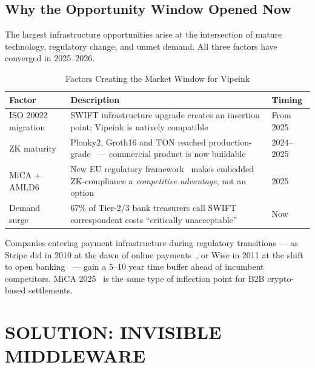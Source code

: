 \documentclass[11pt,a4paper]{article}
\begin{document}
\subsection*{Why the Opportunity Window Opened Now}

The largest infrastructure opportunities arise at the intersection of mature technology, regulatory change, and unmet demand. All three factors have converged in 2025--2026.

\begin{table}[htbp]
\centering
\caption{Factors Creating the Market Window for Vipeink}
\begin{tabularx}{\linewidth}{@{}lXl@{}}
\toprule
\textbf{Factor} & \textbf{Description} & \textbf{Timing} \\
\midrule
ISO 20022 migration   & SWIFT infrastructure upgrade creates an insertion point; Vipeink is natively compatible~\cite{swift_iso20022}              & From 2025 \\
ZK maturity           & Plonky2, Groth16 and TON reached production-grade~\cite{plonky2,groth16,ton_wp} --- commercial product is now buildable            & 2024--2025 \\
MiCA + AMLD6           & New EU regulatory framework~\cite{mica_reg,amld6} makes embedded ZK-compliance a \textit{competitive advantage}, not an option & 2025 \\
Demand surge          & 67\% of Tier-2/3 bank treasurers call SWIFT correspondent costs ``critically unacceptable''~\cite{mckinsey_2024}           & Now \\
\bottomrule
\end{tabularx}
\end{table}

\begin{tcolorbox}[insightbox, title={Investor Insight}]
Companies entering payment infrastructure during regulatory transitions --- as Stripe did in 2010 at the dawn of online payments~\cite{stripe_s1}, or Wise in 2011 at the shift to open banking~\cite{wise_ar} --- gain a 5--10 year time buffer ahead of incumbent competitors. MiCA 2025~\cite{mica_reg} is the same type of inflection point for B2B crypto-based settlements.
\end{tcolorbox}


\FloatBarrier
\section{SOLUTION: INVISIBLE MIDDLEWARE}
\end{document}
